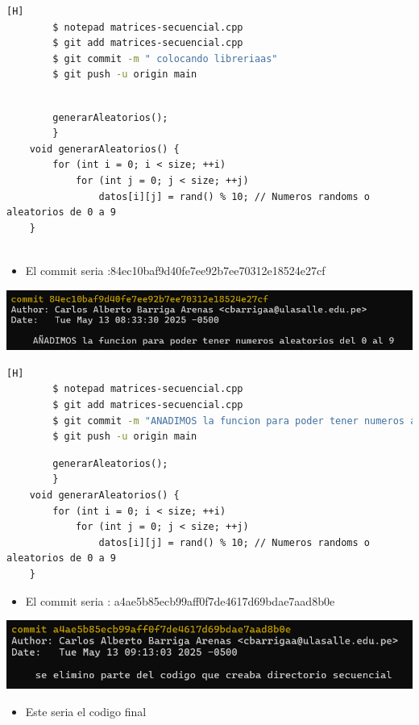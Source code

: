 \documentclass{article}
\begin{document}
	\begin{lstlisting}[language=bash,caption={Creamos en lab02 }][H]
		$ notepad matrices-secuencial.cpp
		$ git add matrices-secuencial.cpp
		$ git commit -m " colocando libreriaas"
		$ git push -u origin main
	\end{lstlisting}
        \begin{lstlisting}

        generarAleatorios();
        }
    void generarAleatorios() {
        for (int i = 0; i < size; ++i)
            for (int j = 0; j < size; ++j)
                datos[i][j] = rand() % 10; // Numeros randoms o aleatorios de 0 a 9
    }
    
	\end{lstlisting}
	\begin{itemize}	
		\item El commit seria :84ec10baf9d40fe7ee92b7ee70312e18524e27cf
\end{itemize}	
	\includegraphics[width=1\textwidth]{img/commit_1.png}
  	\begin{lstlisting}[language=bash,caption={Actualisamos matrices-secuencial.cpp }][H]
		$ notepad matrices-secuencial.cpp
		$ git add matrices-secuencial.cpp
		$ git commit -m "ANADIMOS la funcion para poder tener numeros aleatorios del 0 al 9"
		$ git push -u origin main
	\end{lstlisting}
  	\begin{lstlisting}
        generarAleatorios();
        }
    void generarAleatorios() {
        for (int i = 0; i < size; ++i)
            for (int j = 0; j < size; ++j)
                datos[i][j] = rand() % 10; // Numeros randoms o aleatorios de 0 a 9
    }
	\end{lstlisting}
	\begin{itemize}	
		\item El commit seria : a4ae5b85ecb99aff0f7de4617d69bdae7aad8b0e
	\end{itemize}	
	\includegraphics[width=1\textwidth]{img/commit_2.png}
	\begin{itemize}	
		\item Este seria el codigo final
	\end{itemize}
\end{document}
